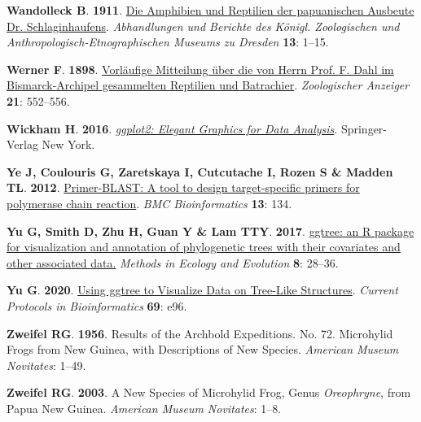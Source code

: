 \documentclass[
  letterpaper,
  DIV=11,
  numbers=noendperiod]{scrartcl}
\newlength{\cslhangindent}
\newenvironment{CSLReferences}[2] %
 {\begin{list}{}{%
  \setlength{\itemindent}{0pt}
  \setlength{\leftmargin}{0pt}
  \setlength{\parsep}{0pt}
  \ifodd #1
   \setlength{\leftmargin}{\cslhangindent}
   \setlength{\itemindent}{-1\cslhangindent}
  \fi
  \setlength{\itemsep}{#2\baselineskip}}}
 {\end{list}}
\begin{document}
\begin{CSLReferences}{0}{1}
\textbf{\textbf{Wandolleck B}}. \textbf{1911}.
\href{https://www.biodiversitylibrary.org/part/263989}{{Die Amphibien
und Reptilien der papuanischen Ausbeute Dr. Schlaginhaufens}}.
\emph{Abhandlungen und Berichte des K{ö}nigl. Zoologischen und
Anthropologisch-Etnographischen Museums zu Dresden} \textbf{13}: 1--15.

\textbf{\textbf{Werner F}}. \textbf{1898}.
\href{https://www.biodiversitylibrary.org/part/28256}{{Vorl{ä}ufige
Mitteilung {ü}ber die von Herrn Prof. F. Dahl im Bismarck-Archipel
gesammelten Reptilien und Batrachier}}. \emph{Zoologischer Anzeiger}
\textbf{21}: 552--556.

\textbf{\textbf{Wickham H}}. \textbf{2016}.
\emph{\href{https://ggplot2.tidyverse.org}{{ggplot2: Elegant Graphics
for Data Analysis}}}. Springer-Verlag New York.

\textbf{\textbf{Ye J}, \textbf{Coulouris G}, \textbf{Zaretskaya I},
\textbf{Cutcutache I}, \textbf{Rozen S} \& \textbf{Madden TL}}.
\textbf{2012}.
\href{https://doi.org/10.1186/1471-2105-13-134}{{Primer-BLAST: A tool to
design target-specific primers for polymerase chain reaction}}.
\emph{BMC Bioinformatics} \textbf{13}: 134.

\textbf{\textbf{Yu G}, \textbf{Smith D}, \textbf{Zhu H}, \textbf{Guan Y}
\& \textbf{Lam TTY}}. \textbf{2017}.
\href{https://doi.org/10.1111/2041-210X.12628}{{ggtree: an R package for
visualization and annotation of phylogenetic trees with their covariates
and other associated data.}} \emph{Methods in Ecology and Evolution}
\textbf{8}: 28--36.

\textbf{\textbf{Yu G}}. \textbf{2020}.
\href{https://doi.org/10.1002/cpbi.96}{{Using ggtree to Visualize Data
on Tree-Like Structures}}. \emph{Current Protocols in Bioinformatics}
\textbf{69}: e96.

\textbf{\textbf{Zweifel RG}}. \textbf{1956}. {Results of the Archbold
Expeditions. No. 72. Microhylid Frogs from New Guinea, with Descriptions
of New Species}. \emph{American Museum Novitates}: 1--49.

\textbf{\textbf{Zweifel RG}}. \textbf{2003}. {A New Species of
Microhylid Frog, Genus \emph{Oreophryne}, from Papua New Guinea}.
\emph{American Museum Novitates}: 1--8.


\end{CSLReferences}
\end{document}

